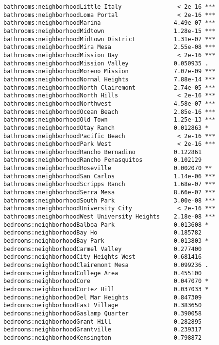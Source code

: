 \documentclass[
  letterpaper,
  krantz2]{style/krantz}
\begin{document}
\begin{verbatim}
bathrooms:neighborhoodLittle Italy                < 2e-16 ***
bathrooms:neighborhoodLoma Portal                 < 2e-16 ***
bathrooms:neighborhoodMarina                     4.49e-07 ***
bathrooms:neighborhoodMidtown                    1.28e-15 ***
bathrooms:neighborhoodMidtown District           1.31e-07 ***
bathrooms:neighborhoodMira Mesa                  2.55e-08 ***
bathrooms:neighborhoodMission Bay                 < 2e-16 ***
bathrooms:neighborhoodMission Valley             0.050935 .  
bathrooms:neighborhoodMoreno Mission             7.07e-09 ***
bathrooms:neighborhoodNormal Heights             7.88e-14 ***
bathrooms:neighborhoodNorth Clairemont           2.74e-05 ***
bathrooms:neighborhoodNorth Hills                 < 2e-16 ***
bathrooms:neighborhoodNorthwest                  4.58e-07 ***
bathrooms:neighborhoodOcean Beach                2.85e-16 ***
bathrooms:neighborhoodOld Town                   1.25e-13 ***
bathrooms:neighborhoodOtay Ranch                 0.012863 *  
bathrooms:neighborhoodPacific Beach               < 2e-16 ***
bathrooms:neighborhoodPark West                   < 2e-16 ***
bathrooms:neighborhoodRancho Bernadino           0.122861    
bathrooms:neighborhoodRancho Penasquitos         0.102129    
bathrooms:neighborhoodRoseville                  0.002070 ** 
bathrooms:neighborhoodSan Carlos                 1.14e-06 ***
bathrooms:neighborhoodScripps Ranch              1.68e-07 ***
bathrooms:neighborhoodSerra Mesa                 8.66e-07 ***
bathrooms:neighborhoodSouth Park                 3.00e-08 ***
bathrooms:neighborhoodUniversity City             < 2e-16 ***
bathrooms:neighborhoodWest University Heights    2.18e-08 ***
bedrooms:neighborhoodBalboa Park                 0.013608 *  
bedrooms:neighborhoodBay Ho                      0.185782    
bedrooms:neighborhoodBay Park                    0.013803 *  
bedrooms:neighborhoodCarmel Valley               0.277400    
bedrooms:neighborhoodCity Heights West           0.681416    
bedrooms:neighborhoodClairemont Mesa             0.099236 .  
bedrooms:neighborhoodCollege Area                0.455100    
bedrooms:neighborhoodCore                        0.047070 *  
bedrooms:neighborhoodCortez Hill                 0.037033 *  
bedrooms:neighborhoodDel Mar Heights             0.847309    
bedrooms:neighborhoodEast Village                0.383650    
bedrooms:neighborhoodGaslamp Quarter             0.390058    
bedrooms:neighborhoodGrant Hill                  0.282895    
bedrooms:neighborhoodGrantville                  0.239317    
bedrooms:neighborhoodKensington                  0.798872    

\end{verbatim}
\end{document}
